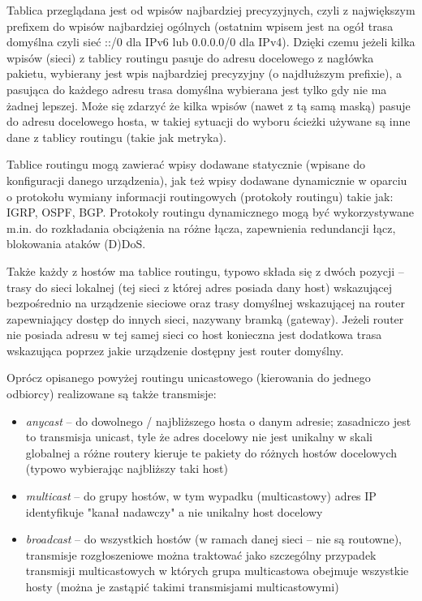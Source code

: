 \documentclass{pdfBooklets}
\begin{document}
Tablica przeglądana jest od wpisów najbardziej precyzyjnych, czyli z największym prefixem do wpisów najbardziej ogólnych (ostatnim wpisem jest na ogół trasa domyślna czyli sieć ::/0 dla IPv6 lub 0.0.0.0/0 dla IPv4). Dzięki czemu jeżeli kilka wpisów (sieci) z tablicy routingu pasuje do adresu docelowego z nagłówka pakietu, wybierany jest wpis najbardziej precyzyjny (o najdłuższym prefixie), a pasująca do każdego adresu trasa domyślna wybierana jest tylko gdy nie ma żadnej lepszej. Może się zdarzyć że kilka wpisów (nawet z tą samą maską) pasuje do adresu docelowego hosta, w takiej sytuacji do wyboru ścieżki używane są inne dane z tablicy routingu (takie jak metryka).

Tablice routingu mogą zawierać wpisy dodawane statycznie (wpisane do konfiguracji danego urządzenia), jak też wpisy dodawane dynamicznie w oparciu o protokołu wymiany informacji routingowych (protokoły routingu) takie jak: IGRP, OSPF, BGP. Protokoły routingu dynamicznego mogą być wykorzystywane m.in. do rozkładania obciążenia na różne łącza, zapewnienia redundancji łącz, blokowania ataków (D)DoS.

Także każdy z hostów ma tablice routingu, typowo składa się z dwóch pozycji – trasy do sieci lokalnej (tej sieci z której adres posiada dany host) wskazującej bezpośrednio na urządzenie sieciowe oraz trasy domyślnej wskazującej na router zapewniający dostęp do innych sieci, nazywany bramką (gateway). Jeżeli router nie posiada adresu w tej samej sieci co host konieczna jest dodatkowa trasa wskazująca poprzez jakie urządzenie dostępny jest router domyślny.

Oprócz opisanego powyżej routingu unicastowego (kierowania do jednego odbiorcy) realizowane są także transmisje:
\begin{itemize}
	\item \emph{anycast} – do dowolnego / najbliższego hosta o danym adresie; zasadniczo jest to transmisja unicast, tyle że adres docelowy nie jest unikalny w skali globalnej a różne routery kieruje te pakiety do różnych hostów docelowych (typowo wybierając najbliższy taki host)
	\item \emph{multicast} – do grupy hostów, w tym wypadku (multicastowy) adres IP identyfikuje "kanał nadawczy" a nie unikalny host docelowy
	\item \emph{broadcast} – do wszystkich hostów (w ramach danej sieci – nie są routowne), transmisje rozgłoszeniowe można traktować jako szczególny przypadek transmisji multicastowych w których grupa multicastowa obejmuje wszystkie hosty (można je zastąpić takimi transmisjami multicastowymi)
\end{itemize}
\end{document}
